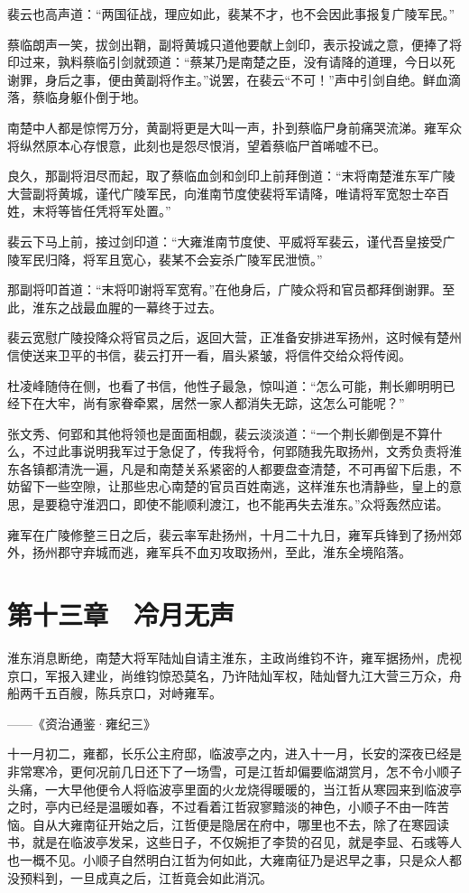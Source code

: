 裴云也高声道：“两国征战，理应如此，裴某不才，也不会因此事报复广陵军民。”

蔡临朗声一笑，拔剑出鞘，副将黄城只道他要献上剑印，表示投诚之意，便捧了将印过来，孰料蔡临引剑就颈道：“蔡某乃是南楚之臣，没有请降的道理，今日以死谢罪，身后之事，便由黄副将作主。”说罢，在裴云“不可！”声中引剑自绝。鲜血滴落，蔡临身躯仆倒于地。

南楚中人都是惊愕万分，黄副将更是大叫一声，扑到蔡临尸身前痛哭流涕。雍军众将纵然原本心存恨意，此刻也是怨尽恨消，望着蔡临尸首唏嘘不已。

良久，那副将泪尽而起，取了蔡临血剑和剑印上前拜倒道：“末将南楚淮东军广陵大营副将黄城，谨代广陵军民，向淮南节度使裴将军请降，唯请将军宽恕士卒百姓，末将等皆任凭将军处置。”

裴云下马上前，接过剑印道：“大雍淮南节度使、平威将军裴云，谨代吾皇接受广陵军民归降，将军且宽心，裴某不会妄杀广陵军民泄愤。”

那副将叩首道：“末将叩谢将军宽宥。”在他身后，广陵众将和官员都拜倒谢罪。至此，淮东之战最血腥的一幕终于过去。

裴云宽慰广陵投降众将官员之后，返回大营，正准备安排进军扬州，这时候有楚州信使送来卫平的书信，裴云打开一看，眉头紧皱，将信件交给众将传阅。

杜凌峰随侍在侧，也看了书信，他性子最急，惊叫道：“怎么可能，荆长卿明明已经下在大牢，尚有家眷牵累，居然一家人都消失无踪，这怎么可能呢？”

张文秀、何郢和其他将领也是面面相觑，裴云淡淡道：“一个荆长卿倒是不算什么，不过此事说明我军过于急促了，传我将令，何郢随我先取扬州，文秀负责将淮东各镇都清洗一遍，凡是和南楚关系紧密的人都要盘查清楚，不可再留下后患，不妨留下一些空隙，让那些忠心南楚的官员百姓南逃，这样淮东也清静些，皇上的意思，是要稳守淮泗口，即使不能顺利渡江，也不能再失去淮东。”众将轰然应诺。

雍军在广陵修整三日之后，裴云率军赴扬州，十月二十九日，雍军兵锋到了扬州郊外，扬州郡守弃城而逃，雍军兵不血刃攻取扬州，至此，淮东全境陷落。

\chapter{第十三章　冷月无声}

淮东消息断绝，南楚大将军陆灿自请主淮东，主政尚维钧不许，雍军据扬州，虎视京口，军报入建业，尚维钧惊恐莫名，乃许陆灿军权，陆灿督九江大营三万众，舟船两千五百艘，陈兵京口，对峙雍军。

——《资治通鉴·雍纪三》

十一月初二，雍都，长乐公主府邸，临波亭之内，进入十一月，长安的深夜已经是非常寒冷，更何况前几日还下了一场雪，可是江哲却偏要临湖赏月，怎不令小顺子头痛，一大早他便令人将临波亭里面的火龙烧得暖暖的，当江哲从寒园来到临波亭之时，亭内已经是温暖如春，不过看着江哲寂寥黯淡的神色，小顺子不由一阵苦恼。自从大雍南征开始之后，江哲便是隐居在府中，哪里也不去，除了在寒园读书，就是在临波亭发呆，这些日子，不仅婉拒了李贽的召见，就是李显、石彧等人也一概不见。小顺子自然明白江哲为何如此，大雍南征乃是迟早之事，只是众人都没预料到，一旦成真之后，江哲竟会如此消沉。

